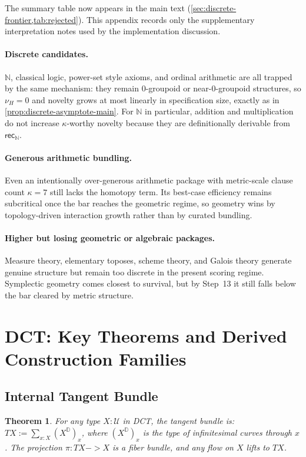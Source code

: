 \documentclass[11pt,a4paper]{article}
\def\to{->}%
\theoremstyle{plain}
\newtheorem{theorem}{Theorem}[section]
\theoremstyle{definition}
\theoremstyle{remark}
\newcommand{\N}{\mathbb{N}}
\newcommand{\D}{\mathbb{D}}
\newcommand{\U}{\mathcal{U}}
\begin{document}
The summary table now appears in the main text (\cref{sec:discrete-frontier,tab:rejected}).
This appendix records only the supplementary interpretation notes used by the implementation discussion.

\paragraph{Discrete candidates.}
$\N$, classical logic, power-set style axioms, and ordinal arithmetic are all trapped by the same mechanism: they remain 0-groupoid or near-0-groupoid structures, so $\nu_H=0$ and novelty grows at most linearly in specification size, exactly as in \cref{prop:discrete-asymptote-main}.
For $\N$ in particular, addition and multiplication do not increase $\kappa$-worthy novelty because they are definitionally derivable from $\mathsf{rec}_\N$.

\paragraph{Generous arithmetic bundling.}
Even an intentionally over-generous arithmetic package with metric-scale clause count $\kappa=7$ still lacks the homotopy term.
Its best-case efficiency remains subcritical once the bar reaches the geometric regime, so geometry wins by topology-driven interaction growth rather than by curated bundling.

\paragraph{Higher but losing geometric or algebraic packages.}
Measure theory, elementary toposes, scheme theory, and Galois theory generate genuine structure but remain too discrete in the present scoring regime.
Symplectic geometry comes closest to survival, but by Step~13 it still falls below the bar cleared by metric structure.

\section{DCT: Key Theorems and Derived Construction Families}
\label{app:dct}

\subsection{Internal Tangent Bundle}

\begin{theorem}
\label{thm:tangent}
For any type $X : \U$ in DCT, the tangent bundle is:
$TX := \sum_{x : X} (X^{\D})_x$,
where $(X^{\D})_x$ is the type of infinitesimal curves through $x$.
The projection $\pi : TX \to X$ is a fiber bundle, and any flow on $X$ lifts to $TX$.
\end{theorem}
\end{document}
